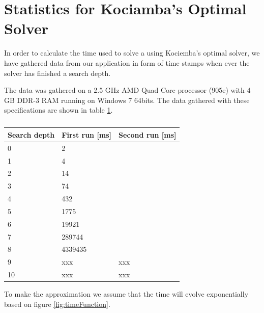 \section{Statistics for Kociamba's Optimal Solver}
\label{app:kociembaTime}
In order to calculate the time used to solve a \rubik{} using Kociemba's optimal solver, we have gathered data from our application in form of time stamps when ever the solver has finished a search depth.

The data was gathered on a 2.5 GHz AMD Quad Core processor (905e) with 4 GB DDR-3 RAM running on Windows 7 64bits.
The data gathered with these specifications are shown in table \ref{tab:timeData}.

\begin{table}[hb]
\centering
	\begin{tabular}{|l|l|l|}
	\hline
	Search depth&First run [ms]&Second run [ms]\\
	\hline
	0&2&\\
	\hline
	1&4&\\
	\hline
	2&14&\\
	\hline
	3&74&\\
	\hline
	4&432&\\
	\hline
	5&1775&\\
	\hline
	6&19921&\\
	\hline
	7&289744&\\
	\hline
	8&4339435&\\
	\hline
	9&xxx&xxx\\
	\hline
	10&xxx&xxx\\
	\hline
	\end{tabular}
\caption{}
	\label{tab:timeData}
\end{table}

To make the approximation we assume that the time will evolve exponentially based on figure \ref{fig:timeFunction}.

